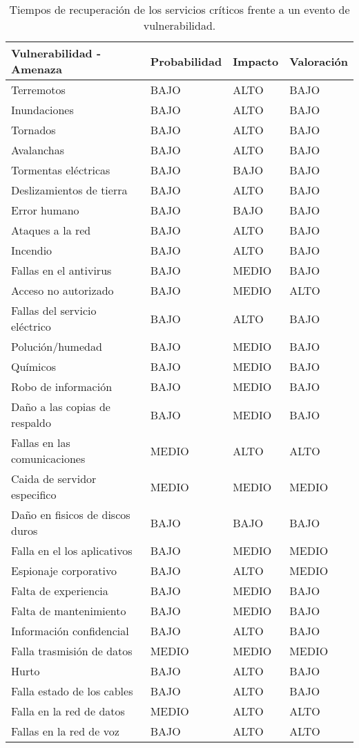 \documentclass[conference]{IEEEtran}
\begin{document}
\begin{table}[h!]
\begin{tabular}{|l|l|l|l|}
\hline
Vulnerabilidad   - Amenaza          & Probabilidad & Impacto & Valoración \\ \hline
Terremotos & BAJO         & ALTO & BAJO\\ \hline
Inundaciones & BAJO & ALTO & BAJO\\ \hline
Tornados & BAJO & ALTO & BAJO\\ \hline
Avalanchas & BAJO & ALTO & BAJO\\ \hline
Tormentas eléctricas & BAJO & BAJO & BAJO\\ \hline
Deslizamientos de   tierra & BAJO & ALTO & BAJO\\ \hline
Error humano   & BAJO & BAJO    & BAJO\\ \hline
Ataques a la red & BAJO & ALTO & BAJO\\ \hline
Incendio & BAJO & ALTO & BAJO\\ \hline
Fallas en el   antivirus & BAJO & MEDIO & BAJO\\ \hline
Acceso no autorizado & BAJO & MEDIO   & ALTO\\ \hline
Fallas del servicio eléctrico & BAJO & ALTO & BAJO\\ \hline
Polución/humedad & BAJO & MEDIO & BAJO\\ \hline
Químicos & BAJO & MEDIO & BAJO\\ \hline
Robo de información & BAJO & MEDIO & BAJO\\ \hline
Daño a las copias de   respaldo & BAJO & MEDIO & BAJO\\ \hline
Fallas en las comunicaciones & MEDIO & ALTO & ALTO \\ \hline
Caida de servidor especifico & MEDIO & MEDIO & MEDIO \\ \hline
Daño en fisicos de discos duros & BAJO & BAJO & BAJO \\ \hline
Falla en el los aplicativos & BAJO & MEDIO & MEDIO \\ \hline
Espionaje corporativo & BAJO & ALTO & MEDIO \\ \hline
Falta de experiencia & BAJO & MEDIO & BAJO \\ \hline
Falta de mantenimiento & BAJO & MEDIO & BAJO \\ \hline
Información confidencial & BAJO & ALTO & BAJO \\ \hline
Falla trasmisión de datos & MEDIO & MEDIO & MEDIO \\ \hline
Hurto & BAJO & ALTO & BAJO \\ \hline
Falla estado de los cables & BAJO & ALTO & BAJO \\ \hline
Falla en la red de datos & MEDIO & ALTO & ALTO \\ \hline
Fallas en la red de voz & BAJO & ALTO & ALTO \\ \hline

\end{tabular}
\caption{Tiempos de recuperación de los servicios críticos frente a un evento de vulnerabilidad.}
\end{table}
\end{document}

